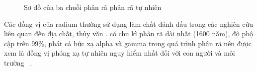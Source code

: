 \begin{figure}[htbp]
    \centering 
    \setlength{\fboxsep}{0pt}%
    \setlength{\fboxrule}{0.8pt}%
    \caption{Sơ đồ của ba chuỗi phân rã phân rã tự nhiên ~\cite{IAEANo476:revise}}
    \label{figure:ChainDecay}
\end{figure}
 

Các đồng vị của radium thường sử dụng làm chất đánh dấu trong các nghiên cứu liên quan đến địa chất, thủy văn .  có chu kì phân rã dài nhất (1600 năm), độ phộ cập trên 99\%, phát cả bức xạ alpha và gamma trong quá trình phân rã nên được xem là đồng vị phóng xạ tự nhiên nguy hiểm nhất đối với con người và môi trường ~\cite{IAEANo476:revise}.

